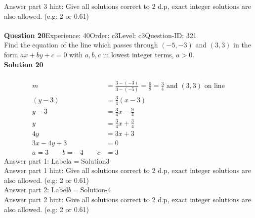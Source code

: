 \documentclass{article}
\begin{document}
Answer part 3 hint: \hspace{15pt}Give all solutions correct to 2 d.p, exact integer solutions are also allowed. (e.g: 2 or 0.61)\\
\\[4pt]
\noindent\textbf{Question 20}\hspace{20pt}Experience: 40\hspace{20pt}Order: c3\hspace{20pt}Level: c3\hspace{20pt}Question-ID: 321\\[2pt]
Find the equation of the line which passes through $(-5,-3)$ and $(3,3)$ in the form $ax+by+c=0$ with $a,b,c$ in lowest integer terms, $a>0$.\\[4pt]
\noindent\textbf{Solution 20}\\[2pt]
\\[-35pt]\begin{align*}
m&=\displaystyle\frac{3-(-3)}{3-(-5)}=\displaystyle\frac{6}{8}=\displaystyle\frac{3}{4}\,\,\text{and}\,\, (3,3) \,\,\text{on line}\\[2pt]
(y-3)&=\displaystyle\frac{3}{4}(x-3)\\[2pt]
y-3&=\displaystyle\frac{3}{4}x-\displaystyle\frac{9}{4}\\[2pt]
y&=\displaystyle\frac{3}{4}x+\displaystyle\frac{3}{4}\\[2pt]
4y&=3x+3\\[2pt]
3x-4y+3&=0\\[2pt]
a=3\qquad b=-4 \qquad c&=3
\end{align*}
Answer part 1: \hspace{10pt}Label\hspace{10pt}$a=$\hspace{10pt}Solution\hspace{10pt}3\\
Answer part 1 hint: \hspace{15pt}Give all solutions correct to 2 d.p, exact integer solutions are also allowed. (e.g: 2 or 0.61)\\
Answer part 2: \hspace{10pt}Label\hspace{10pt}$b=$\hspace{10pt}Solution\hspace{10pt}-4\\
Answer part 2 hint: \hspace{15pt}Give all solutions correct to 2 d.p, exact integer solutions are also allowed. (e.g: 2 or 0.61)\\
\end{document}
